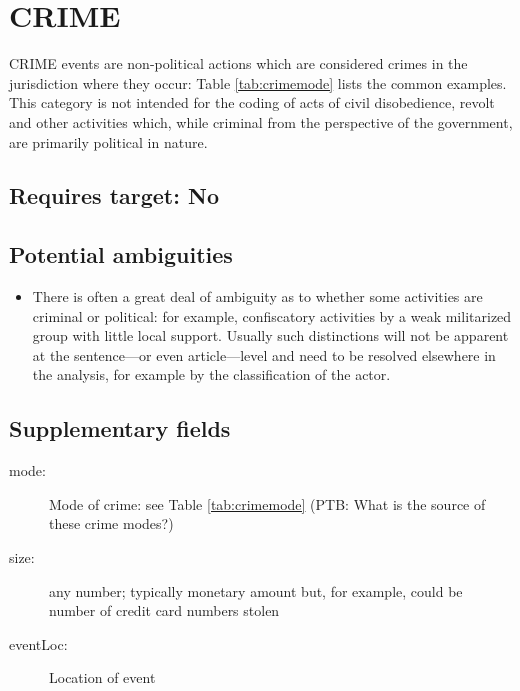 \documentclass[11pt]{report}
\newcommand{\plcat}[1]{\textsf{#1}}
\begin{document}
\newpage  

\section{CRIME}

\plcat{CRIME} events are non-political actions which are considered crimes in the jurisdiction where they occur: Table \ref{tab:crimemode} lists the common examples. This category is not intended for the coding of acts of civil disobedience, revolt and other activities which, while criminal from the perspective of the government, are primarily political in nature.

\subsection{Requires target: No}

\subsection{Potential ambiguities}

\begin{itemize}
\item There is often a great deal of ambiguity as to whether some activities are criminal or political: for example, confiscatory activities by a weak militarized group with little local support. Usually such distinctions will not be apparent at the sentence---or even article---level and need to be resolved elsewhere in the analysis, for example by the classification of the actor.
\end{itemize}

\subsection{Supplementary fields}

\begin{description}
    \item[mode:] Mode of crime: see Table \ref{tab:crimemode} (PTB: What is the source of these crime modes?)
    \item[size:]  any number; typically monetary amount but, for example, could be number of credit card numbers stolen 
    \item[eventLoc:] Location of event 
\end{description}
\end{document}
